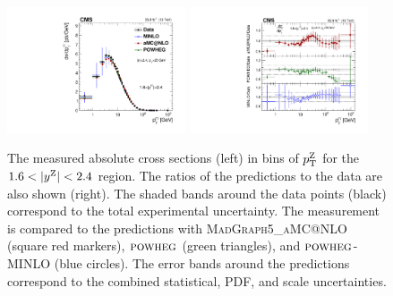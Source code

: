 \begin{figure}
	\centering
	\includegraphics[width=0.47\textwidth]{figures/zpt/zll_double_rap4.pdf}
        \includegraphics[width=0.47\textwidth]{figures/zpt/zll_double_ratio_rap4.pdf}
	\caption{The measured absolute cross sections (left) in bins of $p_{\mathrm{T}}^{\mathrm{Z}}$ for the $1.6 < |y^{\mathrm{Z}}| < 2.4$ region. The ratios of the predictions to the data are also shown (right). The shaded bands around the data points (black) correspond to the total experimental uncertainty. The measurement is compared to the predictions with \textsc{MadGraph5\_aMC@NLO} (square red markers),  ${\textsc{powheg}}$ (green triangles), and ${\textsc{powheg}}$-\textsc{MINLO} (blue circles). The error bands around the predictions correspond to the combined statistical, PDF, and scale uncertainties.}
	\label{fig:zll_double4}
\end{figure}

